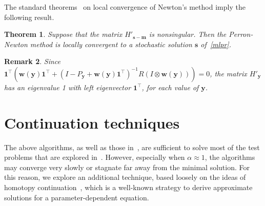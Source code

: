 \documentclass[10pt]{paper}
\newtheorem{theorem}{Theorem}
\newtheorem{remark}[theorem]{Remark}
\begin{document}
The standard theorems~\cite{OrtegaBook} on local convergence of Newton's method imply the following result.
\begin{theorem}
	Suppose that the matrix $H'_{{\mathbf{s}} - {\mathbf{m}}}$ is nonsingular. Then the Perron-Newton method is locally convergent to a stochastic solution ${\mathbf{s}}$ of~\eqref{mlpr}. 
\end{theorem}
\begin{remark}
Since ${\mathbf{1}}^\top \left(
{\mathbf{w}}({\mathbf{y}}) {\mathbf{1}}^\top + (I-P_{\mathbf{y}} + {\mathbf{w}}({\mathbf{y}}){\mathbf{1}}^\top)^{-1}R(I\otimes {\mathbf{w}}({\mathbf{y}}))
\right)=0$,
the matrix $H'_{\mathbf{y}}$ has an eigenvalue 1 with left eigenvector ${\mathbf{1}}^\top$, for each value of ${\mathbf{y}}$.
\end{remark}

\section{Continuation techniques} \label{sec:homotopy}
The above algorithms, as well as those in~\cite{GleLY15}, are sufficient to solve most of the test problems that are explored in~\cite{GleLY15}. However, especially when $\alpha\approx 1$, the algorithms may converge very slowly or stagnate far away from the minimal solution. For this reason, we explore an additional technique, based loosely on the ideas of homotopy continuation~\cite{Li97}, which is a well-known strategy to derive approximate solutions for a parameter-dependent equation.
\end{document}
